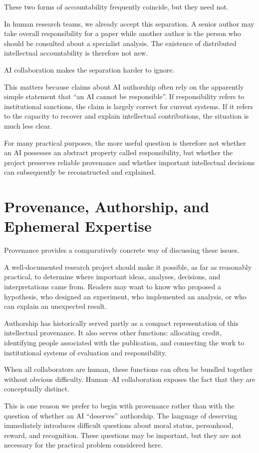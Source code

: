 These two forms of accountability frequently coincide, but they need not.

In human research teams, we already accept this separation. A senior author may take overall responsibility for a paper while another author is the person who should be consulted about a specialist analysis. The existence of distributed intellectual accountability is therefore not new.

AI collaboration makes the separation harder to ignore.

This matters because claims about AI authorship often rely on the apparently simple statement that ``an AI cannot be responsible''. If responsibility refers to institutional sanctions, the claim is largely correct for current systems. If it refers to the capacity to recover and explain intellectual contributions, the situation is much less clear.

For many practical purposes, the more useful question is therefore not whether an AI possesses an abstract property called responsibility, but whether the project preserves reliable provenance and whether important intellectual decisions can subsequently be reconstructed and explained.


\section{Provenance, Authorship, and Ephemeral Expertise}

Provenance provides a comparatively concrete way of discussing these issues.

A well-documented research project should make it possible, as far as reasonably practical, to determine where important ideas, analyses, decisions, and interpretations came from. Readers may want to know who proposed a hypothesis, who designed an experiment, who implemented an analysis, or who can explain an unexpected result.

Authorship has historically served partly as a compact representation of this intellectual provenance. It also serves other functions: allocating credit, identifying people associated with the publication, and connecting the work to institutional systems of evaluation and responsibility.

When all collaborators are human, these functions can often be bundled together without obvious difficulty. Human--AI collaboration exposes the fact that they are conceptually distinct.

This is one reason we prefer to begin with provenance rather than with the question of whether an AI ``deserves'' authorship. The language of deserving immediately introduces difficult questions about moral status, personhood, reward, and recognition. These questions may be important, but they are not necessary for the practical problem considered here.

